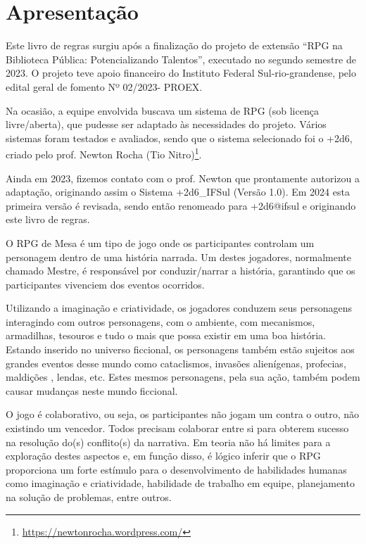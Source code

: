\chapter[Apresentação]{\label{ch:apres}Apresentação}

Este livro de regras surgiu após a finalização do projeto de extensão “RPG na Biblioteca Pública: Potencializando Talentos”, executado no segundo semestre de 2023. O projeto teve apoio financeiro do Instituto Federal Sul-rio-grandense, pelo edital geral de fomento Nº 02/2023- PROEX. 

Na ocasião, a equipe envolvida buscava um sistema de RPG (sob licença livre/aberta), que pudesse ser adaptado às necessidades do projeto. Vários sistemas foram testados e avaliados, sendo que o sistema selecionado foi o +2d6, criado pelo prof. Newton Rocha (Tio Nitro)\footnote{\url{https://newtonrocha.wordpress.com/}}. 

Ainda em 2023, fizemos contato com o prof. Newton que prontamente autorizou a adaptação, originando assim o Sistema +2d6\_IFSul (Versão 1.0). Em 2024 esta primeira versão é revisada, sendo então renomeado para +2d6@ifsul e originando este livro de regras.

O RPG de Mesa é um tipo de jogo onde os participantes controlam um personagem dentro de uma história narrada. Um destes jogadores, normalmente chamado Mestre, é responsável por conduzir/narrar a história, garantindo que os participantes vivenciem dos eventos ocorridos. 

Utilizando a imaginação e criatividade, os jogadores conduzem seus personagens interagindo com outros personagens, com o ambiente, com mecanismos, armadilhas, tesouros e tudo o mais que possa existir em uma boa história. Estando inserido no universo ficcional, os personagens também estão sujeitos aos grandes eventos desse mundo como cataclismos, invasões alienígenas, profecias, maldições , lendas, etc. Estes mesmos personagens, pela sua ação, também podem causar mudanças neste mundo ficcional.

O jogo é colaborativo, ou seja, os participantes não jogam um contra o outro, não existindo um vencedor. Todos precisam colaborar entre si para obterem sucesso na resolução do(s) conflito(s) da narrativa. Em teoria não há limites para a exploração destes aspectos e, em função disso, é lógico inferir que o RPG proporciona um forte estímulo para o desenvolvimento de habilidades humanas como imaginação e criatividade, habilidade de trabalho em equipe, planejamento na solução de problemas, entre outros.

